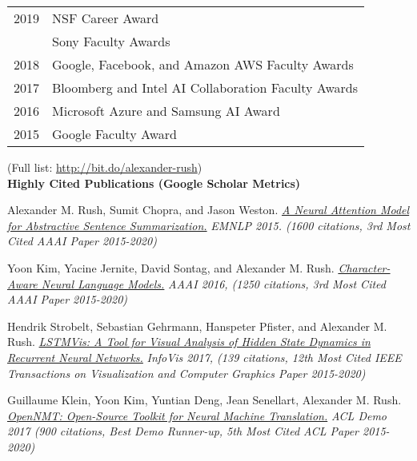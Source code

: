 \documentclass[10pt]{article}
\begin{document}

\hspace{-1cm} \begin{tabular}{lp{11.5cm}}
	2019 & NSF Career Award                                    \\
	     & Sony Faculty Awards                                 \\
	2018 & Google, Facebook, and Amazon AWS Faculty Awards     \\
	2017 & Bloomberg and Intel AI Collaboration Faculty Awards \\
	2016 & Microsoft Azure  and Samsung AI Award               \\
	2015 & Google Faculty Award                                \\
\end{tabular}
\pagebreak


\bigskip



\noindent (Full list: \url{http://bit.do/alexander-rush}) \\

\medskip
\noindent
\textbf{Highly Cited Publications (Google Scholar Metrics)}

\ind Alexander M. Rush, Sumit Chopra, and Jason Weston. \emph{\href{ http://arxiv.org/pdf/1509.00685.pdf }{ A Neural Attention Model for Abstractive Sentence Summarization.} }\emph{ EMNLP 2015. (1600 citations, 3rd Most Cited AAAI Paper 2015-2020) }

\medskip


\ind Yoon Kim, Yacine Jernite, David Sontag, and Alexander M. Rush. \emph{\href{ https://arxiv.org/pdf/1508.06615v4 }{ Character-Aware Neural Language Models.} }\emph{ AAAI 2016, (1250 citations, 3rd Most Cited AAAI Paper 2015-2020) }

\medskip

\ind Hendrik Strobelt, Sebastian Gehrmann, Hanspeter Pfister, and Alexander M. Rush. \emph{\href{ http://lstm.seas.harvard.edu/ }{ LSTMVis: A Tool for Visual Analysis of Hidden State Dynamics in Recurrent Neural Networks.} }\emph{ InfoVis 2017, (139 citations, 12th Most Cited IEEE Transactions on Visualization and Computer Graphics Paper 2015-2020) }



\medskip
\ind Guillaume Klein, Yoon Kim, Yuntian Deng, Jean Senellart, Alexander M. Rush. \emph{\href{ https://arxiv.org/abs/1701.02810 }{ OpenNMT: Open-Source Toolkit for Neural Machine Translation.} }\emph{ ACL Demo 2017 (900 citations, Best Demo Runner-up, 5th Most Cited ACL Paper 2015-2020) }
\end{document}
